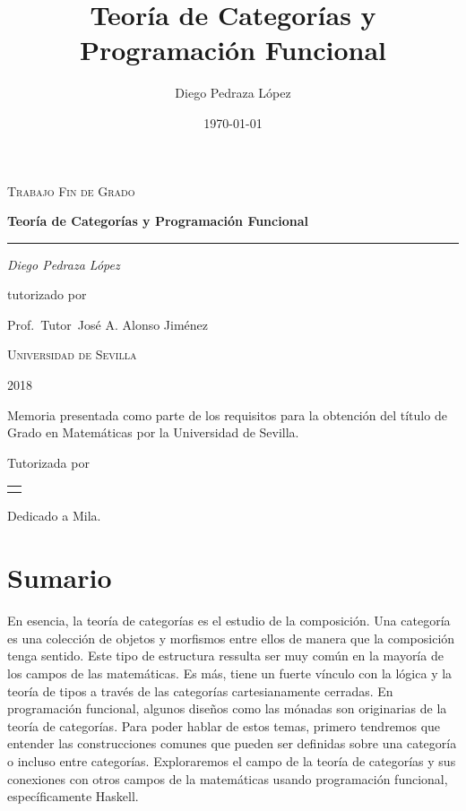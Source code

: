 \documentclass[12pt, twoside]{book}
\title{Teoría de Categorías y Programación Funcional}
\author{Diego Pedraza López}
\date{\today}
\makeatletter
\newenvironment{dedication}
  {\clearpage           %
   \thispagestyle{empty}%
   \vspace*{\stretch{1}}%
   \itshape             %
   \raggedleft          %
  }
  {\par %
   \vspace{\stretch{3}} %
   \clearpage           %
  }
\renewcommand\maketitle{%
  \begin{titlepage}
  \parindent=0pt
  \begin{flushleft}
  \vspace*{1.5mm}
  \setlength\baselineskip{0pt}
  \setlength\parskip{0mm}
  \begin{center}
  \end{center}
  \end{flushleft}
  \vspace{1cm}
  \bgroup
  \Large \bfseries
  \begin{center}
  \@title
  \end{center}
  \egroup
  \vspace*{.5cm}
  \begin{center}
  \@author
  \end{center}
  \begin{center}
  2018
  \end{center}
  \vspace*{1.8cm}
  \begin{flushright}
  \begin{minipage}{8.45cm}
      Memoria presentada como parte de los requisitos para la obtención del título de
      Grado en Matemáticas por la Universidad de Sevilla.

      \vspace*{7.5mm}

      Tutorizada por
  \end{minipage}\par
  \begin{tabularx}{8.45cm}[b]{@{}l}
      \guardatutores
  \end{tabularx}
   \end{flushright}
      \vspace*{\fill}
   \end{titlepage}
   \pagestyle{tfg}
   \renewcommand{\chaptermark}[1]{\markright{\thechapter.\space ##1}}
   \renewcommand{\sectionmark}[1]{}
   \renewcommand{\subsectionmark}[1]{}
  }
\makeatother
\begin{document}
\begin{titlepage}
  \centering
  {\scshape\Large Trabajo Fin de Grado\par}
  \vspace{1.5cm}
  {\huge\bfseries Teoría de Categorías y Programación Funcional\par}
  \vspace{0.025cm}
  \rule{0.4\textwidth}{0.4pt}
  \vspace{1cm}

  {\Large\itshape Diego Pedraza López\par}
  \vspace{1cm}
  tutorizado por\par
  Prof.~Tutor~José A. Alonso Jiménez\par
  \vspace{1cm}
  \vspace{7cm}

  {\scshape\LARGE Universidad de Sevilla \par}
  \vfill
\end{titlepage}

\maketitle

\begin{dedication}
Dedicado a Mila.  
\end{dedication}
\frontmatter

\tableofcontents

\mainmatter

\chapter*{Sumario}
En esencia, la teoría de categorías es el estudio de la composición.
Una categoría es una colección de objetos y morfismos entre ellos de manera que la composición tenga sentido.
Este tipo de estructura ressulta ser muy común en la mayoría de los campos de las matemáticas.
Es más, tiene un fuerte vínculo con la lógica y la teoría de tipos a través de las categorías cartesianamente cerradas.
En programación funcional, algunos diseños como las mónadas son originarias de la teoría de categorías.
Para poder hablar de estos temas, primero tendremos que entender las construcciones comunes que pueden ser definidas sobre una categoría o incluso entre categorías.
Exploraremos el campo de la teoría de categorías y sus conexiones con otros campos de la matemáticas usando programación funcional, específicamente Haskell.
\end{document}
